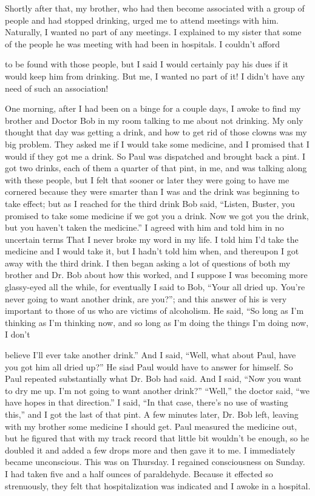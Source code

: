 \begin{biblechapter}
Shortly after that, my brother, who had then become associated with a group of people and had stopped drinking, urged me to attend meetings with him. Naturally, I wanted no part of any meetings. I explained to my sister that some of the people he was meeting with had been in hospitals. I couldn’t afford

to be found with those people, but I said I would certainly pay his dues if it would keep him from drinking. But me, I wanted no part of it! I didn’t have any need of such an association!

One morning, after I had been on a binge for a couple days, I awoke to find my brother and Doctor Bob in my room talking to me about not drinking. My only thought that day was getting a drink, and how to get rid of those clowns was my big problem. They asked me if I would take some medicine, and I promised that I would if they got me a drink. So Paul was dispatched and brought back a pint. I got two drinks, each of them a quarter of that pint, in me, and was talking along with these people, but I felt that sooner or later they were going to have me cornered because they were smarter than I was and the drink was beginning to take effect; but as I reached for the third drink Bob said, “Listen, Buster, you promised to take some medicine if we got you a drink. Now we got you the drink, but you haven’t taken the medicine.” I agreed with him and told him in no uncertain terms That I never broke my word in my life. I told him I’d take the medicine and I would take it, but I hadn’t told him when, and thereupon I got away with the third drink. I then began asking a lot of questions of both my brother and Dr. Bob about how this worked, and I suppose I was becoming more glassy-eyed all the while, for eventually I said to Bob, “Your all dried up. You’re never going to want another drink, are you?”; and this answer of his is very important to those of us who are victims of alcoholism. He said, “So long as I’m thinking as I’m thinking now, and so long as I’m doing the things I’m doing now, I don’t

believe I’ll ever take another drink.” And I said, “Well, what about Paul, have you got him all dried up?” He siad Paul would have to answer for himself. So Paul repeated substantially what Dr. Bob had said. And I said, “Now you want to dry me up. I’m not going to want another drink?”  “Well,” the doctor said, “we have hopes in that direction.” I said, “In that case, there’s no use of wasting this,” and I got the last of that pint. A few minutes later, Dr. Bob left, leaving with my brother some medicine I should get. Paul measured the medicine out, but he figured that with my track record that little bit wouldn’t be enough, so he doubled it and added a few drops more and then gave it to me. I immediately became unconscious. This was on Thursday. I regained consciousness on Sunday. I had taken five and a half ounces of paraldehyde. Because it effected so strenuously, they felt that hospitalization was indicated and I awoke in a hospital.


\end{biblechapter}
